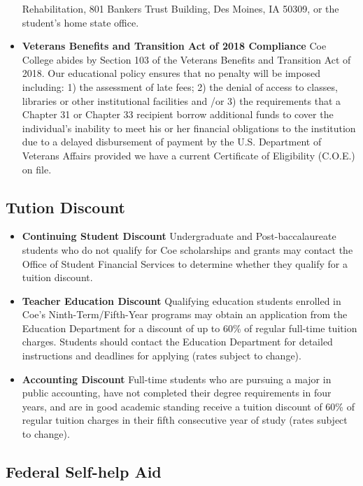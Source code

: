 \documentclass[
  letterpaper,
]{scrbook}
\begin{document}
\begin{itemize}
  Rehabilitation, 801 Bankers Trust Building, Des Moines, IA 50309, or
  the student's home state office.
\item
  \textbf{Veterans Benefits and Transition Act of 2018 Compliance} Coe
  College abides by Section 103 of the Veterans Benefits and Transition
  Act of 2018. Our educational policy ensures that no penalty will be
  imposed including: 1) the assessment of late fees; 2) the denial of
  access to classes, libraries or other institutional facilities and /or
  3) the requirements that a Chapter 31 or Chapter 33 recipient borrow
  additional funds to cover the individual's inability to meet his or
  her financial obligations to the institution due to a delayed
  disbursement of payment by the U.S. Department of Veterans Affairs
  provided we have a current Certificate of Eligibility (C.O.E.) on
  file.
\end{itemize}

\hypertarget{tution-discount}{%
\subsection{Tution Discount}\label{tution-discount}}

\begin{itemize}
\item
  \textbf{Continuing Student Discount} Undergraduate and
  Post-baccalaureate students who do not qualify for Coe scholarships
  and grants may contact the Office of Student Financial Services to
  determine whether they qualify for a tuition discount.
\item
  \textbf{Teacher Education Discount} Qualifying education students
  enrolled in Coe's Ninth-Term/Fifth-Year programs may obtain an
  application from the Education Department for a discount of up to 60\%
  of regular full-time tuition charges. Students should contact the
  Education Department for detailed instructions and deadlines for
  applying (rates subject to change).
\item
  \textbf{Accounting Discount} Full-time students who are pursuing a
  major in public accounting, have not completed their degree
  requirements in four years, and are in good academic standing receive
  a tuition discount of 60\% of regular tuition charges in their fifth
  consecutive year of study (rates subject to change).
\end{itemize}

\hypertarget{federal-self-help-aid}{%
\subsection{Federal Self-help Aid}\label{federal-self-help-aid}}
\end{document}
